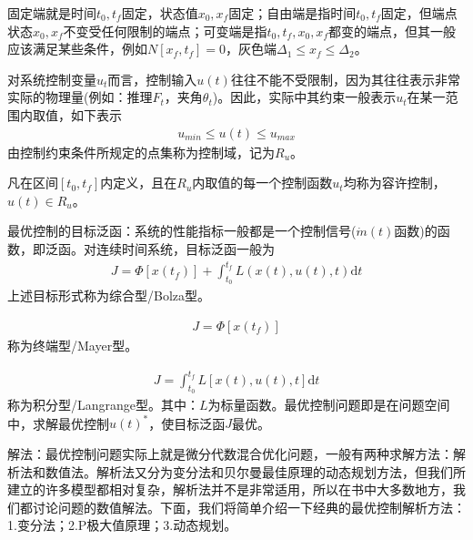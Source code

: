             \par
            固定端就是时间$t_0,t_f$固定，状态值$x_0,x_f$固定；自由端是指时间$t_0,t_f$固定，但端点状态$x_0,x_f$不变受任何限制的端点；可变端是指$t_0,t_f,x_0,x_f$都变的端点，但其一般应该满足某些条件，例如$N[x_f,t_f] = 0$，灰色端$\Delta_1 \leqslant x_f \leqslant \Delta_2$。
            \par
            对系统控制变量$u_t$而言，控制输入$u(t)$往往不能不受限制，因为其往往表示非常实际的物理量(例如：推理$F_t$，夹角$\theta_t$)。因此，实际中其约束一般表示$u_t$在某一范围内取值，如下表示
            \begin{align*}
            u_{min}  \leqslant u(t) \leqslant u_{max}
            \end{align*}
            由控制约束条件所规定的点集称为控制域，记为$ R_u$。
            \par
            凡在区间$[t_0,t_f]$内定义，且在$R_u$内取值的每一个控制函数$u_t$均称为容许控制，$u(t)\in R_u$。
            \par
            最优控制的目标泛函：系统的性能指标一般都是一个控制信号($\dot{m}(t)$函数)的函数，即泛函。对连续时间系统，目标泛函一般为
            \begin{align*}
            J = \Phi[x(t_f)] +\int_{t_0}^{t_f}L(x(t),u(t),t)\mathrm{d}t
            \end{align*}
            上述目标形式称为综合型/Bolza型。
            \par
            \begin{align*}
            J = \Phi[x(t_f)]
            \end{align*}
            称为终端型/Mayer型。
            \par
            \begin{align*}
            J = \int_{t_0}^{t_f} L[x(t),u(t),t]\mathrm{d}t
            \end{align*}
            称为积分型/Langrange型。其中：$L$为标量函数。最优控制问题即是在问题空间中，求解最优控制$u(t)^*$，使目标泛函$J$最优。
            \par
            解法：最优控制问题实际上就是微分代数混合优化问题，一般有两种求解方法：解析法和数值法。解析法又分为变分法和贝尔曼最佳原理的动态规划方法，但我们所建立的许多模型都相对复杂，解析法并不是非常适用，所以在书中大多数地方，我们都讨论问题的数值解法。下面，我们将简单介绍一下经典的最优控制解析方法：1.变分法；2.P极大值原理；3.动态规划。
